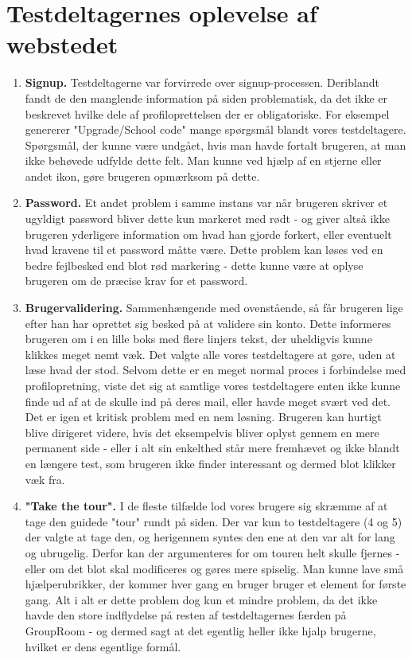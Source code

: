 \documentclass[12pt]{article}
\begin{document}
\section{Testdeltagernes oplevelse af webstedet}
\begin{enumerate}
  \item \textbf{Signup.} Testdeltagerne var forvirrede over signup-processen. Deriblandt fandt de den manglende information på siden problematisk, da det ikke er beskrevet hvilke dele af profiloprettelsen der er obligatoriske. For eksempel genererer "Upgrade/School code" mange spørgsmål blandt vores testdeltagere. Spørgsmål, der kunne være undgået, hvis man havde fortalt brugeren, at man ikke behøvede udfylde dette felt. Man kunne ved hjælp af en stjerne eller andet ikon, gøre brugeren opmærksom på dette.
    
  \item \textbf{Password.} Et andet problem i samme instans var når brugeren skriver et ugyldigt password bliver dette kun markeret med rødt - og giver altså ikke brugeren yderligere information om hvad han gjorde forkert, eller eventuelt hvad kravene til et password måtte være. Dette problem kan løses ved en bedre fejlbesked end blot rød markering - dette kunne være at oplyse brugeren om de præcise krav for et password.
  
  \item \textbf{Brugervalidering.} Sammenhængende med ovenstående, så får brugeren lige efter han har oprettet sig besked på at validere sin konto. Dette informeres brugeren om i en lille boks med flere linjers tekst, der uheldigvis kunne klikkes meget nemt væk. Det valgte alle vores testdeltagere at gøre, uden at læse hvad der stod. Selvom dette er en meget normal proces i forbindelse med profilopretning, viste det sig at samtlige vores testdeltagere enten ikke kunne finde ud af at de skulle ind på deres mail, eller havde meget svært ved det. Det er igen et kritisk problem med en nem løsning. Brugeren kan hurtigt blive dirigeret videre, hvis det eksempelvis bliver oplyst gennem en mere permanent side - eller i alt sin enkelthed står mere fremhævet og ikke blandt en længere test, som brugeren ikke finder interessant og dermed blot klikker væk fra.
  
  \item \textbf{"Take the tour".} I de fleste tilfælde lod vores brugere sig skræmme af at tage den guidede "tour" rundt på siden. Der var kun to testdeltagere (4 og 5) der valgte at tage den, og herigennem syntes den ene at den var alt for lang og ubrugelig. Derfor kan der argumenteres for om touren helt skulle fjernes - eller om det blot skal modificeres og gøres mere spiselig. Man kunne lave små hjælperubrikker, der kommer hver gang en bruger bruger et element for første gang. Alt i alt er dette problem dog kun et mindre problem, da det ikke havde den store indflydelse på resten af testdeltagernes færden på GroupRoom - og dermed sagt at det egentlig heller ikke hjalp brugerne, hvilket er dens egentlige formål.
  

\end{enumerate}
\end{document}
